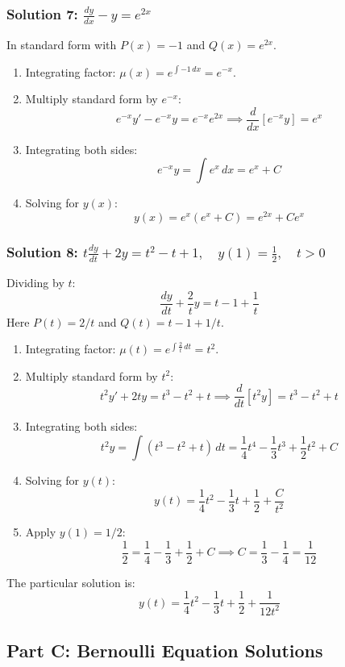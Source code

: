 \documentclass[11pt,letterpaper]{article}
\begin{document}
\subsubsection*{Solution 7: $\frac{dy}{dx} - y = e^{2x}$}
In standard form with $P(x) = -1$ and $Q(x) = e^{2x}$.
\begin{enumerate}
    \item Integrating factor: $\mu(x) = e^{\int -1 \, dx} = e^{-x}$.
    \item Multiply standard form by $e^{-x}$:
    \[ e^{-x} y' - e^{-x} y = e^{-x} e^{2x} \implies \frac{d}{dx}[e^{-x}y] = e^x \]
    \item Integrating both sides:
    \[ e^{-x}y = \int e^x \, dx = e^x + C \]
    \item Solving for $y(x)$:
    \[ y(x) = e^x(e^x + C) = e^{2x} + C e^x \]
\end{enumerate}

\subsubsection*{Solution 8: $t \frac{dy}{dt} + 2y = t^2 - t + 1, \quad y(1) = \frac{1}{2}, \quad t > 0$}
Dividing by $t$:
\[ \frac{dy}{dt} + \frac{2}{t}y = t - 1 + \frac{1}{t} \]
Here $P(t) = 2/t$ and $Q(t) = t - 1 + 1/t$.
\begin{enumerate}
    \item Integrating factor: $\mu(t) = e^{\int \frac{2}{t} \, dt} = t^2$.
    \item Multiply standard form by $t^2$:
    \[ t^2 y' + 2ty = t^3 - t^2 + t \implies \frac{d}{dt}[t^2 y] = t^3 - t^2 + t \]
    \item Integrating both sides:
    \[ t^2 y = \int (t^3 - t^2 + t) \, dt = \frac{1}{4}t^4 - \frac{1}{3}t^3 + \frac{1}{2}t^2 + C \]
    \item Solving for $y(t)$:
    \[ y(t) = \frac{1}{4}t^2 - \frac{1}{3}t + \frac{1}{2} + \frac{C}{t^2} \]
    \item Apply $y(1) = 1/2$:
    \[ \frac{1}{2} = \frac{1}{4} - \frac{1}{3} + \frac{1}{2} + C \implies C = \frac{1}{3} - \frac{1}{4} = \frac{1}{12} \]
\end{enumerate}
The particular solution is:
\[ y(t) = \frac{1}{4}t^2 - \frac{1}{3}t + \frac{1}{2} + \frac{1}{12t^2} \]

\subsection*{Part C: Bernoulli Equation Solutions}
\end{document}
